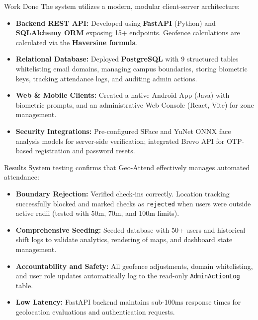\documentclass{beamer}
\begin{document}
\begin{frame}{Work Done}
  The system utilizes a modern, modular client-server architecture:
  \begin{itemize}
    \item \textbf{Backend REST API:} Developed using \textbf{FastAPI} (Python) and \textbf{SQLAlchemy ORM} exposing 15+ endpoints. Geofence calculations are calculated via the \textbf{Haversine formula}.
    \item \textbf{Relational Database:} Deployed \textbf{PostgreSQL} with 9 structured tables whitelisting email domains, managing campus boundaries, storing biometric keys, tracking attendance logs, and auditing admin actions.
    \item \textbf{Web \& Mobile Clients:} Created a native Android App (Java) with biometric prompts, and an administrative Web Console (React, Vite) for zone management.
    \item \textbf{Security Integrations:} Pre-configured SFace and YuNet ONNX face analysis models for server-side verification; integrated Brevo API for OTP-based registration and password resets.
  \end{itemize}
\end{frame}

\begin{frame}{Results}
  System testing confirms that Geo-Attend effectively manages automated attendance:
  \begin{itemize}
    \item \textbf{Boundary Rejection:} Verified check-ins correctly. Location tracking successfully blocked and marked checks as \texttt{rejected} when users were outside active radii (tested with 50m, 70m, and 100m limits).
    \item \textbf{Comprehensive Seeding:} Seeded database with 50+ users and historical shift logs to validate analytics, rendering of maps, and dashboard state management.
    \item \textbf{Accountability and Safety:} All geofence adjustments, domain whitelisting, and user role updates automatically log to the read-only \texttt{AdminActionLog} table.
    \item \textbf{Low Latency:} FastAPI backend maintains sub-100ms response times for geolocation evaluations and authentication requests.
  \end{itemize}
\end{frame}
\end{document}
